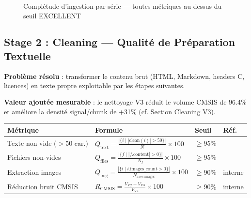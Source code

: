 \documentclass[12pt,a4paper]{report}
\begin{document}
\begin{figure}[H]
\centering
{}
\caption{Complétude d'ingestion par série --- toutes métriques au-dessus du seuil EXCELLENT}
\label{fig:eval_ingestion_chart_dead}
\end{figure}

\subsection{Stage 2 : Cleaning --- Qualité de Préparation Textuelle}
\label{sec:eval_cleaning}

\textbf{Problème résolu} : transformer le contenu brut (HTML, Markdown, headers C, licences) en texte propre exploitable par les étapes suivantes.

\textbf{Valeur ajoutée mesurable} : le nettoyage V3 réduit le volume CMSIS de 96.4\% et améliore la densité signal/chunk de +31\% (cf. Section Cleaning V3).

\begin{longtable}{p{5cm}p{5.5cm}p{2cm}p{1.5cm}}
\toprule
\textbf{Métrique} & \textbf{Formule} & \textbf{Seuil} & \textbf{Réf.} \\
\midrule
Texte non-vide ($>50$ car.) & $Q_{\text{text}} = \frac{|\{i \mid |\text{clean}(i)| > 50\}|}{N} \times 100$ & $\geq 95\%$ & \cite{iso25012} \\
Fichiers non-vides & $Q_{\text{files}} = \frac{|\{f \mid |f.\text{content}| > 0\}|}{N_f} \times 100$ & $\geq 95\%$ & \cite{iso25012} \\
Extraction images & $Q_{\text{img}} = \frac{|\{i \mid i.\text{images\_count} > 0\}|}{N_{\text{avec\_images}}} \times 100$ & $\geq 90\%$ & interne \\
Réduction bruit CMSIS & $R_{\text{CMSIS}} = \frac{V_{\text{V2}} - V_{\text{V3}}}{V_{\text{V2}}} \times 100$ & $\geq 90\%$ & interne \\
\bottomrule
\end{longtable}
\end{document}
